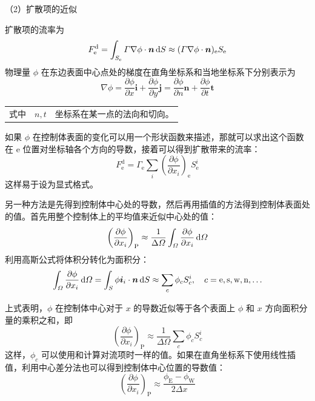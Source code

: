 （2）扩散项的近似

扩散项的流率为
\begin{equation}
	F_{\mathrm{e}}^{\mathrm{d}} = 
	\int_{S_{\mathrm{e}}}\varGamma\nabla\phi\cdot\bm{n}\,\mathrm{d} S \approx
	(\varGamma\nabla\phi\cdot\bm{n})_{\mathrm{e}} S_{\mathrm{e}}
\end{equation}
物理量 $\phi$ 在东边表面中心点处的梯度在直角坐标系和当地坐标系下分别表示为
\begin{equation}
	\nabla\phi = 
	\frac{\partial\phi}{\partial x}\bm{i} + \frac{\partial\phi}{\partial y}\bm{j} = 
	\frac{\partial\phi}{\partial n}\bm{n} + \frac{\partial\phi}{\partial t}\bm{t}
\end{equation}
\begin{tabularx}{\textwidth}{@{}l@{\quad}r@{——}X@{}}
	式中 & $n,t$ & 坐标系在某一点的法向和切向。
\end{tabularx}\vspace{3.15bp}

如果 $\phi$ 在控制体表面的变化可以用一个形状函数来描述，那就可以求出这个函数在 e 位置对坐标轴各个方向的导数，接着可以得到扩散带来的流率：
\begin{equation}\label{eq: diffusive flux}
	F_{\mathrm{e}}^{\mathrm{d}} = \varGamma_{\mathrm{e}} \sum_i \left(\frac{\partial\phi}{\partial x_i}\right)_{\mathrm{e}} S_{\mathrm{e}}^i
\end{equation}
这样易于设为显式格式。

另一种方法是先得到控制体中心处的导数，然后再用插值的方法得到控制体表面处的值。首先用整个控制体上的平均值来近似中心处的值：
\begin{equation}
	\left(\frac{\partial\phi}{\partial x_i}\right)_{\mathrm{P}} \approx
	\frac{1}{\Delta\varOmega}\int_{\varOmega}\frac{\partial\phi}{\partial x_i}\,\mathrm{d}\varOmega
\end{equation}
利用高斯公式将体积分转化为面积分：
\begin{equation}
	\int_{\varOmega}\frac{\partial\phi}{\partial x_i}\,\mathrm{d}\varOmega =
	\int_S \phi\bm{i}_i\cdot\bm{n}\,\mathrm{d} S \approx \sum_c\phi_c S_c^i,
	\quad c=\mathrm{e,s,w,n,\dots}
\end{equation}

上式表明，$\phi$ 在控制体中心对于 $x$ 的导数近似等于各个表面上 $\phi$ 和 $x$ 方向面积分量的乘积之和，即
\begin{equation}
	\left(\frac{\partial\phi}{\partial x_i}\right)_{\mathrm{P}} \approx
	\frac{1}{\Delta\varOmega}\sum_c\phi_c S_c^i
\end{equation}
这样，$\phi_c$ 可以使用和计算对流项时一样的值。如果在直角坐标系下使用线性插值，利用中心差分法也可以得到控制体中心位置的导数值：
\begin{equation}
	\left(\frac{\partial\phi}{\partial x_i}\right)_{\mathrm{P}} \approx
	\frac{\phi_{\mathrm{E}}-\phi_{\mathrm{W}}}{2\Delta x}
\end{equation}


